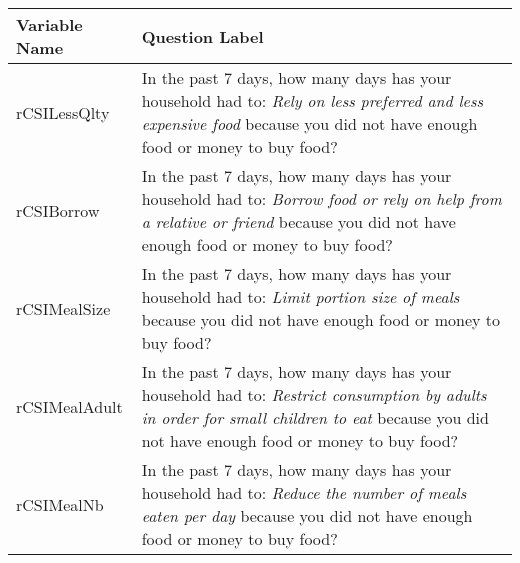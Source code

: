 \documentclass[
]{article}
\begin{document}
\begin{longtable}[]{@{}ll@{}}
\toprule
\begin{minipage}[b]{0.22\columnwidth}\raggedright
Variable Name\strut
\end{minipage} & \begin{minipage}[b]{0.72\columnwidth}\raggedright
Question Label\strut
\end{minipage}\tabularnewline
\midrule
\endhead
\begin{minipage}[t]{0.22\columnwidth}\raggedright
rCSILessQlty\strut
\end{minipage} & \begin{minipage}[t]{0.72\columnwidth}\raggedright
In the past 7 days, how many days has your household had to: \emph{Rely on less preferred and less expensive food} because you did not have enough food or money to buy food?\strut
\end{minipage}\tabularnewline
\begin{minipage}[t]{0.22\columnwidth}\raggedright
rCSIBorrow\strut
\end{minipage} & \begin{minipage}[t]{0.72\columnwidth}\raggedright
In the past 7 days, how many days has your household had to: \emph{Borrow food or rely on help from a relative or friend} because you did not have enough food or money to buy food?\strut
\end{minipage}\tabularnewline
\begin{minipage}[t]{0.22\columnwidth}\raggedright
rCSIMealSize\strut
\end{minipage} & \begin{minipage}[t]{0.72\columnwidth}\raggedright
In the past 7 days, how many days has your household had to: \emph{Limit portion size of meals} because you did not have enough food or money to buy food?\strut
\end{minipage}\tabularnewline
\begin{minipage}[t]{0.22\columnwidth}\raggedright
rCSIMealAdult\strut
\end{minipage} & \begin{minipage}[t]{0.72\columnwidth}\raggedright
In the past 7 days, how many days has your household had to: \emph{Restrict consumption by adults in order for small children to eat} because you did not have enough food or money to buy food?\strut
\end{minipage}\tabularnewline
\begin{minipage}[t]{0.22\columnwidth}\raggedright
rCSIMealNb\strut
\end{minipage} & \begin{minipage}[t]{0.72\columnwidth}\raggedright
In the past 7 days, how many days has your household had to: \emph{Reduce the number of meals eaten per day} because you did not have enough food or money to buy food?\strut
\end{minipage}\tabularnewline
\bottomrule
\end{longtable}
\end{document}
